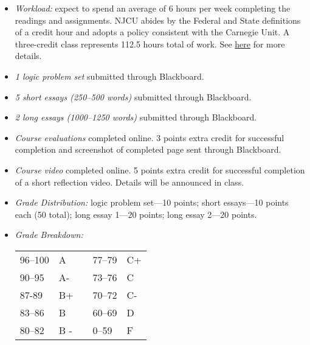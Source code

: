 \documentclass[article,oneside]{memoir}
\begin{document}
\begin{itemize}
\item \textit{Workload:} expect to spend an average of 6 hours per week completing the readings and assignments. NJCU abides by the Federal and State definitions of a credit hour and adopts a policy consistent with the Carnegie Unit. A three-credit class represents 112.5 hours total of work. See \href{http://scottoconnor.org/resources/Credit.pdf}{here} for more details.


\item \textit{1 logic problem set} submitted through Blackboard. 


\item \textit{5 short essays (250--500 words)} submitted through Blackboard. 

\item \textit{2 long essays (1000--1250 words)} submitted through Blackboard. 


\item \textit{Course evaluations} completed online. 3 points extra credit for successful completion and screenshot of completed page sent through Blackboard. 

\item \textit{Course video} completed online. 5 points extra credit for successful completion of a short reflection video. Details will be announced in class.  

\item \textit{Grade Distribution:} logic problem set---10 points; short essays---10 points each (50 total); long essay 1---20 points; long essay 2---20 points. 

\item \textit{Grade Breakdown:}

 \begin{tabular}{ | l | l | p{2cm} | l | l | }
    \hline 
96--100 & A  & &  77--79 &  C+ \\  
90--95 & A- & &  73--76 & C \\
87-89 & B+ &  &  70--72 & C- \\ 
83--86 & B  & &  60--69 & D\\
80--82 & B - & & 0--59 & F\\ \hline
    \end{tabular}


\end{itemize}
\end{document}
